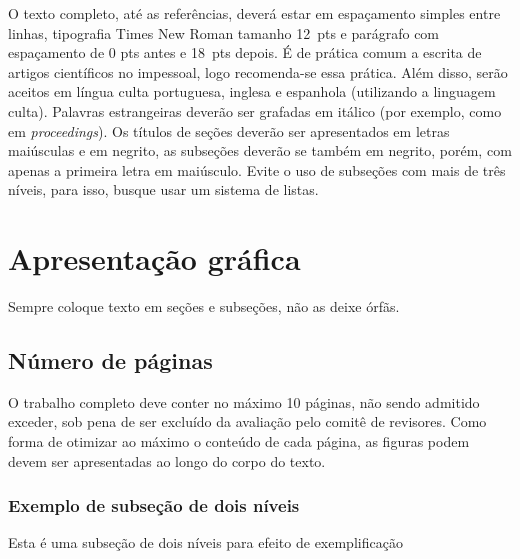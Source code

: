 \documentclass[12pt, a4paper, oneside, onecolumn] {article}%
\begin{document}
O texto completo, até as referências, deverá estar em espaçamento simples entre linhas, tipografia Times New Roman tamanho 12~pts e parágrafo com espaçamento de 0 pts antes e 18~pts depois. É de prática comum a escrita de artigos científicos no impessoal, logo recomenda-se essa prática. Além disso, serão aceitos em língua culta portuguesa, inglesa e espanhola (utilizando a linguagem culta). Palavras estrangeiras deverão ser grafadas em itálico (por exemplo, como em \textit{proceedings}). Os títulos de seções deverão ser apresentados em letras maiúsculas e em negrito, as subseções deverão se também em negrito, porém, com apenas a primeira letra em maiúsculo.  Evite o uso de subseções com mais de três níveis, para isso, busque usar um sistema de listas. 

\setlength\headheight{0pt}
\section{Apresentação gráfica}

Sempre coloque texto em seções e subseções, não as deixe órfãs.

\subsection{Número de páginas}

O trabalho completo deve conter no máximo 10 páginas, não sendo admitido exceder, sob pena de ser excluído da avaliação pelo comitê de revisores. Como forma de otimizar ao máximo o conteúdo de cada página, as figuras podem devem ser apresentadas ao longo do corpo do texto.


\subsubsection{Exemplo de subseção de dois níveis}

Esta é uma subseção de dois níveis para efeito de exemplificação

\end{document}
